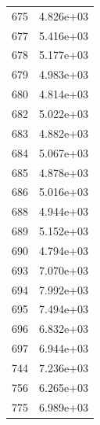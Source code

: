 \documentclass[12pt]{article}
\begin{document}
\begin{longtable}{@{}cc@{}}
675 & 4.826e+03 \\
677 & 5.416e+03 \\
678 & 5.177e+03 \\
679 & 4.983e+03 \\
680 & 4.814e+03 \\
682 & 5.022e+03 \\
683 & 4.882e+03 \\
684 & 5.067e+03 \\
685 & 4.878e+03 \\
686 & 5.016e+03 \\
688 & 4.944e+03 \\
689 & 5.152e+03 \\
690 & 4.794e+03 \\
693 & 7.070e+03 \\
694 & 7.992e+03 \\
695 & 7.494e+03 \\
696 & 6.832e+03 \\
697 & 6.944e+03 \\
744 & 7.236e+03 \\
756 & 6.265e+03 \\
775 & 6.989e+03 \\

\bottomrule
\end{longtable}
\end{document}
